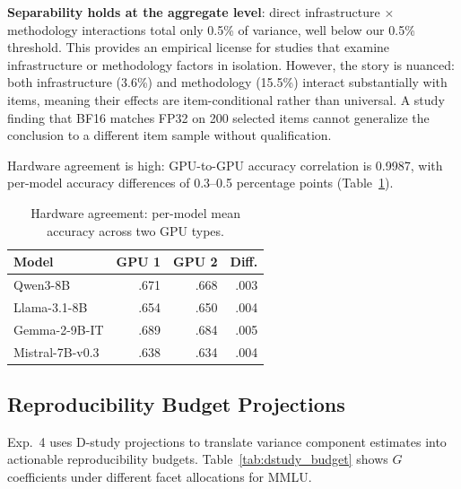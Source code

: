\documentclass[letterpaper,11pt]{article}
\begin{document}
\textbf{Separability holds at the aggregate level}: direct infrastructure $\times$ methodology interactions total only 0.5\% of variance, well below our 0.5\% threshold.
This provides an empirical license for studies that examine infrastructure or methodology factors in isolation.
However, the story is nuanced: both infrastructure (3.6\%) and methodology (15.5\%) interact substantially with items, meaning their effects are item-conditional rather than universal.
A study finding that BF16 matches FP32 on 200 selected items cannot generalize the conclusion to a different item sample without qualification.

Hardware agreement is high: GPU-to-GPU accuracy correlation is 0.9987, with per-model accuracy differences of 0.3--0.5 percentage points (Table~\ref{tab:hardware_agreement}).

\begin{table}[t]
\centering
\caption{Hardware agreement: per-model mean accuracy across two GPU types.}
\label{tab:hardware_agreement}
\small
\begin{tabular}{lrrr}
\toprule
Model & GPU 1 & GPU 2 & Diff. \\
\midrule
Qwen3-8B & .671 & .668 & .003 \\
Llama-3.1-8B & .654 & .650 & .004 \\
Gemma-2-9B-IT & .689 & .684 & .005 \\
Mistral-7B-v0.3 & .638 & .634 & .004 \\
\bottomrule
\end{tabular}
\end{table}

\subsection{Reproducibility Budget Projections}

Exp.~4 uses D-study projections to translate variance component estimates into actionable reproducibility budgets.
Table~\ref{tab:dstudy_budget} shows $G$ coefficients under different facet allocations for MMLU.
\end{document}
